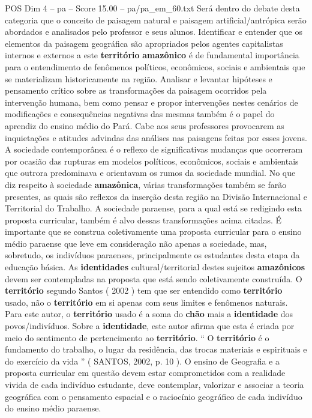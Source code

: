 \begin{textsample}{POS Dim 4 – pa – Score 15.00 – pa/pa\_em\_60.txt}
Será dentro do debate desta categoria que o conceito de paisagem natural e paisagem artificial/antrópica serão abordados e analisados pelo professor e seus alunos.
Identificar e entender que os elementos da paisagem geográfica são apropriados pelos agentes capitalistas internos e externos a este \textbf{território} \textbf{amazônico} é de fundamental importância para o entendimento de fenômenos políticos, econômicos, sociais e ambientais que se materializam historicamente na região.
Analisar e levantar hipóteses e pensamento crítico sobre as transformações da paisagem ocorridos pela intervenção humana, bem como pensar e propor intervenções nestes cenários de modificações e consequências negativas das mesmas também é o papel do aprendiz do ensino médio do Pará.
Cabe aos seus professores provocarem as inquietações e atitudes advindas das análises nas paisagens feitas por esses jovens.
A sociedade contemporânea é o reflexo de significativas mudanças que ocorreram por ocasião das rupturas em modelos políticos, econômicos, sociais e ambientais que outrora predominava e orientavam os rumos da sociedade mundial.
No que diz respeito à sociedade \textbf{amazônica}, várias transformações também se farão presentes, as quais são reflexos da inserção desta região na Divisão Internacional e Territorial do Trabalho.
A sociedade paraense, para a qual está se redigindo esta proposta curricular, também é alvo dessas transformações acima citadas.
É importante que se construa coletivamente uma proposta curricular para o ensino médio paraense que leve em consideração não apenas a sociedade, mas, sobretudo, os indivíduos paraenses, principalmente os estudantes desta etapa da educação básica.
As \textbf{identidades} cultural/territorial destes sujeitos \textbf{amazônicos} devem ser contempladas na proposta que está sendo coletivamente construída.
O \textbf{território} segundo Santos ( 2002 ) tem que ser entendido como \textbf{território} usado, não o \textbf{território} em si apenas com seus limites e fenômenos naturais.
Para este autor, o \textbf{território} usado é a soma do \textbf{chão} mais a \textbf{identidade} dos povos/indivíduos.
Sobre a \textbf{identidade}, este autor afirma que esta é criada por meio do sentimento de pertencimento ao \textbf{território}. “ O \textbf{território} é o fundamento do trabalho, o lugar da residência, das trocas materiais e espirituais e do exercício da vida ” ( SANTOS, 2002, p. 10 ).
O ensino de Geografia e a proposta curricular em questão devem estar comprometidos com a realidade vivida de cada indivíduo estudante, deve contemplar, valorizar e associar a teoria geográfica com o pensamento espacial e o raciocínio geográfico de cada indivíduo do ensino médio paraense.

\end{textsample}
